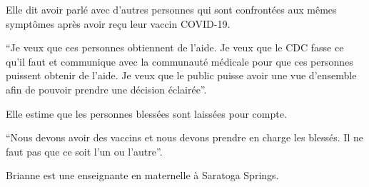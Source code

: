 Elle dit avoir parlé avec d'autres personnes qui sont confrontées aux mêmes
symptômes après avoir reçu leur vaccin COVID-19.

“Je veux que ces personnes obtiennent de l'aide. Je veux que le CDC fasse ce
qu'il faut et communique avec la communauté médicale pour que ces personnes
puissent obtenir de l'aide. Je veux que le public puisse avoir une vue
d'ensemble afin de pouvoir prendre une décision éclairée”.

Elle estime que les personnes blessées sont laissées pour compte.

“Nous devons avoir des vaccins et nous devons prendre en charge les blessés. Il
ne faut pas que ce soit l'un ou l'autre”.

Brianne est une enseignante en maternelle à Saratoga Springs.
